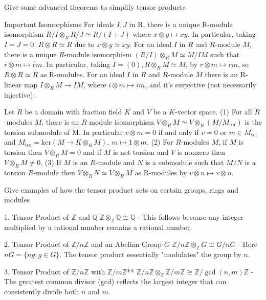 Give some advanced theorems to simplify tensor products

Important Isomorphisms
For ideals \( I, J \) in R, there is a unique R-module isomorphism
\( R/I \otimes_R R/J \simeq R/(I + J) \)
where \( x ⊗ y \mapsto xy \). In particular, taking \( I = J = 0 \), \( R \otimes R \simeq R \) due to \( x \otimes y \simeq xy \).
For an ideal \( I \) in \( R \) and \( R \)-module \( M \), there is a unique \( R \)-module isomorphism
\( (R/I) \otimes_R M \simeq M/IM \)
such that \( r \otimes m \mapsto rm \). 
In particular, taking \( I = (0), R \otimes_R M \simeq M \), by \( r ⊗ m \mapsto rm \), so
\( R \otimes R \simeq R \) as R-modules.
For an ideal \( I \) in \( R \) and \( R \)-module \( M \) there is an R-linear map \( I \otimes_R M \to IM \), 
where \( i \otimes m \mapsto im \), and it’s surjective (not necessarily injective).

Let \( R \) be a domain with fraction field \( K \) and \( V \) be a \( K \)-vector space.
(1) For all \( R \)-modules \( M \), there is an \( R \)-module isomorphism \( V \otimes_R M \simeq V \otimes_R (M/M_{\text{tor}})\) 
is the torsion submodule of M. In particular \( v \otimes m = 0 \) if and only if \( v = 0 \) or \( m \in M_{\text{tor}} \)
and \( M_{\text{tor}} = \text{ker}(M \to K \otimes_R M),\ m \mapsto 1 \otimes m \).
(2) For \( R \)-modules \( M \), if \( M \) is torsion then \( V \otimes_R M = 0 \) and if \( M \) is not torsion and
\( V \) is nonzero then \( V \otimes_R M \neq 0 \).
(3) If \( M \) is an \( R \)-module and \( N \) is a submodule such that \( M/N \) is a torsion \( R \)-module
then \( V \otimes_R N \simeq V \otimes_R M \) as R-modules by \( v \otimes n \mapsto v \otimes n\).


Give examples of how the tensor product acts on certain groups, rings and modules

1. 
Tensor Product of \(\mathbb{Z}\) and \(\mathbb{Q}\)
\( \mathbb{Z} \otimes_{\mathbb{Z}} \mathbb{Q} \cong \mathbb{Q} \)
- This follows because any integer multiplied by a rational number remains a rational number.

2. Tensor Product of \(\mathbb{Z}/n\mathbb{Z}\) and an Abelian Group \(G\)
\(
\mathbb{Z}/n\mathbb{Z} \otimes_{\mathbb{Z}} G \cong G/nG
\)
- Here \(nG = \{ng : g \in G \}\). The tensor product essentially "modulates" the group by \(n\).

3. 
Tensor Product of \(\mathbb{Z}/n\mathbb{Z}\) with \(\mathbb{Z}/m\mathbb{Z}\)**
\(
\mathbb{Z}/n\mathbb{Z} \otimes_{\mathbb{Z}} \mathbb{Z}/m\mathbb{Z} \cong \mathbb{Z}/\gcd(n, m)\mathbb{Z}
\)
- The greatest common divisor (gcd) reflects the largest integer that can consistently divide both \(n\) and \(m\).

